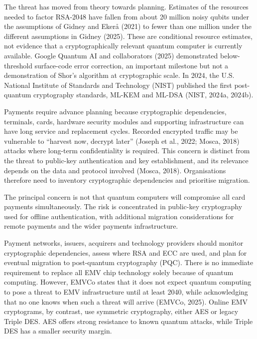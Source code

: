 \documentclass[12pt,oneside]{report}
\begin{document}
The threat has moved from theory towards planning. Estimates of the resources needed to factor RSA-2048 have fallen from about 20 million noisy qubits under the assumptions of Gidney and Ekerå (2021) to fewer than one million under the different assumptions in Gidney (2025). These are conditional resource estimates, not evidence that a cryptographically relevant quantum computer is currently available. Google Quantum AI and collaborators (2025) demonstrated below-threshold surface-code error correction, an important milestone but not a demonstration of Shor’s algorithm at cryptographic scale. In 2024, the U.S. National Institute of Standards and Technology (NIST) published the first post-quantum cryptography standards, ML-KEM and ML-DSA (NIST, 2024a, 2024b).
\par

Payments require advance planning because cryptographic dependencies, terminals, cards, hardware security modules and supporting infrastructure can have long service and replacement cycles. Recorded encrypted traffic may be vulnerable to “harvest now, decrypt later” (Joseph et al., 2022; Mosca, 2018) attacks where long-term confidentiality is required. This concern is distinct from the threat to public-key authentication and key establishment, and its relevance depends on the data and protocol involved (Mosca, 2018). Organisations therefore need to inventory cryptographic dependencies and prioritise migration.
\par

The principal concern is not that quantum computers will compromise all card payments simultaneously. The risk is concentrated in public-key cryptography used for offline authentication, with additional migration considerations for remote payments and the wider payments infrastructure.
\par

Payment networks, issuers, acquirers and technology providers should monitor cryptographic dependencies, assess where RSA and ECC are used, and plan for eventual migration to post-quantum cryptography (PQC). There is no immediate requirement to replace all EMV chip technology solely because of quantum computing. However, EMVCo states that it does not expect quantum computing to pose a threat to EMV infrastructure until at least 2040, while acknowledging that no one knows when such a threat will arrive (EMVCo, 2025). Online EMV cryptograms, by contrast, use symmetric cryptography, either AES or legacy Triple DES. AES offers strong resistance to known quantum attacks, while Triple DES has a smaller security margin.
\par
\end{document}
